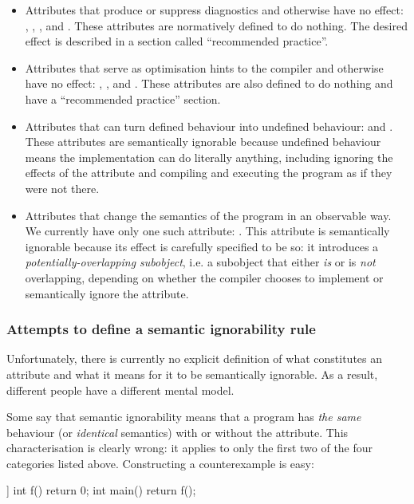 \begin{itemize}
\item Attributes that produce or suppress diagnostics and otherwise have no effect: , , , and . These attributes are normatively defined to do nothing. The desired effect is described in a section called ``recommended practice''.
\item Attributes that serve as optimisation hints to the compiler and otherwise have no effect: , , and . These attributes are also defined to do nothing and have a ``recommended practice'' section.
\item Attributes that can turn defined behaviour into undefined behaviour:  and . These attributes are semantically ignorable because undefined behaviour means the implementation can do literally anything, including ignoring the effects of the attribute and compiling and executing the program as if they were not there.
\item Attributes that change the semantics of the program in an observable way. We currently have only one such attribute: . This attribute is semantically ignorable because its effect is carefully specified to be so: it introduces a \emph{potentially-overlapping subobject}, i.e. a subobject that either \emph{is} or is \emph{not} overlapping, depending on whether the compiler chooses to implement or semantically ignore the attribute.
\end{itemize}

\subsubsection{Attempts to define a semantic ignorability rule}

Unfortunately, there is currently no explicit definition of what constitutes an attribute and what it means for it to be semantically ignorable. As a result, different people have a different mental model.

Some say that semantic ignorability means that a program has \emph{the same} behaviour (or \emph{identical} semantics) with or without the attribute. This characterisation is clearly wrong: it applies to only the first two of the four categories listed above. Constructing a counterexample is easy:

\begin{codeblock}
[[noreturn]] int f() { return 0; }
int main() { return f(); }
\end{codeblock}

